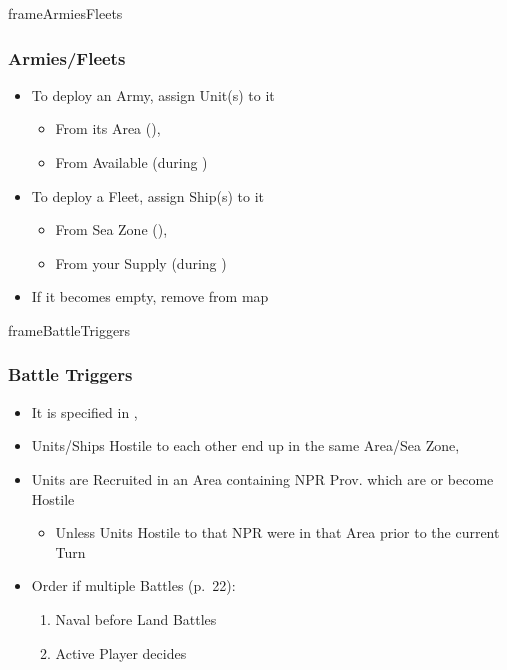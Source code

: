\documentclass[10pt]{article}
\newlength{\fhArmiesFleets} \setlength\fhArmiesFleets{8\baselineskip}
\newlength{\fhBattleSequence} \setlength\fhBattleSequence{50\baselineskip}
\newlength{\fhBattleTriggers} \setlength\fhBattleTriggers{\calc{\textheight - \fhBattleSequence - \frameToFrameSpacing}}
\begin{document}
\begin{dynamiccontents*}{frameArmiesFleets}\begin{eubox}{\fhArmiesFleets}
	\subsubsection*{Armies/Fleets }
	\begin{itemize}
		\item To deploy an Army, assign Unit(s) to it 
		\begin{itemize}
			\item From its Area (), 
			\item From Available \manpower (during )
		\end{itemize}
		\item To deploy a Fleet, assign Ship(s) to it
		\begin{itemize}
			\item From Sea Zone (), 
			\item From your Supply (during )
		\end{itemize}
		\item If it becomes empty, remove from map
	\end{itemize}
\end{eubox}\end{dynamiccontents*}

\begin{dynamiccontents*}{frameBattleTriggers}\begin{eubox}{\fhBattleTriggers}
	\subsubsection*{Battle Triggers }
	\begin{multicols}{2}
		\begin{itemize}
			\item It is specified in , 
			\item Units/Ships Hostile to each other end up in the same Area/Sea Zone, 
			\item {}Units are Recruited in an Area containing NPR Prov. which are or become Hostile
			\begin{itemize}
				\item Unless Units Hostile to that NPR were in that Area prior to the current Turn
			\end{itemize}
			\item Order if multiple Battles (p.~22):
			\begin{enumerate}
				\item Naval before Land Battles
				\item Active Player decides
			\end{enumerate}
		\end{itemize}
	\end{multicols}
\end{eubox}\end{dynamiccontents*}
\end{document}
